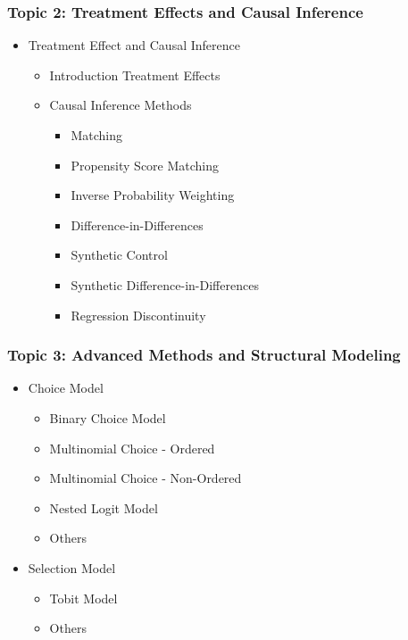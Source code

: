 \documentclass[10pt]{beamer}
\begin{document}
\begin{frame}
    \frametitle{Topic 2: Treatment Effects and Causal Inference}
    \begin{itemize}
        \item Treatment Effect and Causal Inference
        \begin{itemize}
            \item Introduction Treatment Effects
            \item Causal Inference Methods
            \begin{itemize}
                \item Matching
                \item Propensity Score Matching
                \item Inverse Probability Weighting
                \item Difference-in-Differences
                \item Synthetic Control
                \item Synthetic Difference-in-Differences
                \item Regression Discontinuity
            \end{itemize}
        \end{itemize}
    \end{itemize}
\end{frame}

\begin{frame}

\frametitle{Topic 3: Advanced Methods and Structural Modeling}
\begin{itemize}
    \item Choice Model
    \begin{itemize}
        \item Binary Choice Model
        \item Multinomial Choice - Ordered
        \item Multinomial Choice - Non-Ordered
        \item Nested Logit Model
        \item Others
    \end{itemize}

    \item Selection Model
    \begin{itemize}
        \item Tobit Model
        \item Others
    \end{itemize}
\end{itemize}
\end{frame}
\end{document}
